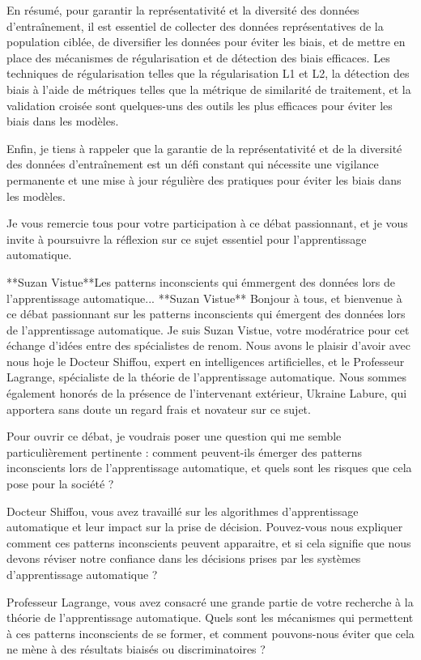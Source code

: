 En résumé, pour garantir la représentativité et la diversité des données d'entraînement, il est essentiel de collecter des données représentatives de la population ciblée, de diversifier les données pour éviter les biais, et de mettre en place des mécanismes de régularisation et de détection des biais efficaces. Les techniques de régularisation telles que la régularisation L1 et L2, la détection des biais à l'aide de métriques telles que la métrique de similarité de traitement, et la validation croisée sont quelques-uns des outils les plus efficaces pour éviter les biais dans les modèles.

Enfin, je tiens à rappeler que la garantie de la représentativité et de la diversité des données d'entraînement est un défi constant qui nécessite une vigilance permanente et une mise à jour régulière des pratiques pour éviter les biais dans les modèles.

Je vous remercie tous pour votre participation à ce débat passionnant, et je vous invite à poursuivre la réflexion sur ce sujet essentiel pour l'apprentissage automatique.


**Suzan Vistue**Les patterns inconscients qui émmergent des données lors de l'apprentissage automatique...
**Suzan Vistue**
Bonjour à tous, et bienvenue à ce débat passionnant sur les patterns inconscients qui émergent des données lors de l'apprentissage automatique. Je suis Suzan Vistue, votre modératrice pour cet échange d'idées entre des spécialistes de renom. Nous avons le plaisir d'avoir avec nous hoje le Docteur Shiffou, expert en intelligences artificielles, et le Professeur Lagrange, spécialiste de la théorie de l'apprentissage automatique. Nous sommes également honorés de la présence de l'intervenant extérieur, Ukraine Labure, qui apportera sans doute un regard frais et novateur sur ce sujet.

 Pour ouvrir ce débat, je voudrais poser une question qui me semble particulièrement pertinente : comment peuvent-ils émerger des patterns inconscients lors de l'apprentissage automatique, et quels sont les risques que cela pose pour la société ?

Docteur Shiffou, vous avez travaillé sur les algorithmes d'apprentissage automatique et leur impact sur la prise de décision. Pouvez-vous nous expliquer comment ces patterns inconscients peuvent apparaitre, et si cela signifie que nous devons réviser notre confiance dans les décisions prises par les systèmes d'apprentissage automatique ?

Professeur Lagrange, vous avez consacré une grande partie de votre recherche à la théorie de l'apprentissage automatique. Quels sont les mécanismes qui permettent à ces patterns inconscients de se former, et comment pouvons-nous éviter que cela ne mène à des résultats biaisés ou discriminatoires ?

